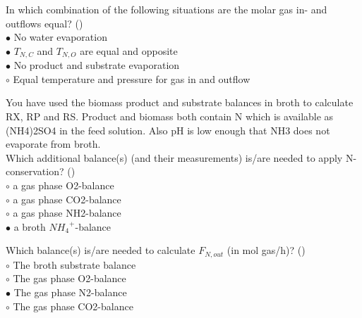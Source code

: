 \documentclass[]{beamer}
\begin{document}
\begin{frame}[shrink] {}
\addtocounter{questions}{1}
\color{blue}
In which combination of the following situations are the molar gas in- and outflows equal?  ()\\
\color{black}
\setlength{\parindent}{-0.4cm}
{\color{red}$\bullet$}   No water evaporation\\
{\color{red}$\bullet$} $T_{N,C}$ and $T_{N,O}$ are equal and opposite  \\
{\color{red}$\bullet$} No product and substrate evaporation\\
{\color{red}$\circ$} Equal temperature and pressure for gas in and outflow    \\
\end{frame}

\begin{frame}[shrink] {}
\addtocounter{questions}{1}
\color{blue}
You have used the biomass product and substrate balances in broth to calculate RX, RP and RS. Product and biomass both contain N which is available as (NH4)2SO4 in the feed solution. Also pH is low enough that NH3 does not evaporate from broth.\\[0.3em]
Which additional balance(s) (and their measurements) is/are needed to apply N-conservation? ()\\
\color{black}
\setlength{\parindent}{-0.4cm}
{\color{red}$\circ$}   a gas phase O2-balance \\
{\color{red}$\circ$} a gas phase CO2-balance \\
{\color{red}$\circ$} a gas phase NH2-balance \\
{\color{red}$\bullet$} a broth ${NH_4}^+$-balance  \\
\end{frame}

\begin{frame}[shrink] {}
\addtocounter{questions}{1}
\color{blue}
Which balance(s) is/are needed to calculate $F_{N,out}$ (in mol gas/h)?  ()\\
\color{black}
\setlength{\parindent}{-0.4cm}
{\color{red}$\circ$}    The broth substrate balance  \\
{\color{red}$\circ$} The gas phase O2-balance  \\
{\color{red}$\bullet$} The gas phase N2-balance\\
{\color{red}$\circ$} The gas phase CO2-balance  \\
\end{frame}
\end{document}
